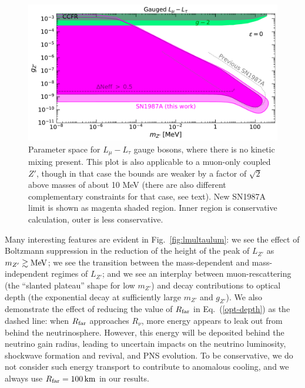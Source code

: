 \documentclass[11pt]{article}
\newcommand{\Eq}[1]{Eq.~(\ref{#1})} \newcommand{\Eqs}[2]{Eqs.~(\ref{#1}) and (\ref{#2})} \newcommand{\Eqm}[2]{Eqs.~(\ref{#1}) through (\ref{#2})}
\begin{document}
\begin{figure}[t!]
  \includegraphics[width=\columnwidth]{zp_mu} \caption{Parameter space for $L_\mu-L_\tau$ gauge bosons, where there is no kinetic mixing present. This plot is also applicable to a muon-only coupled $Z'$, though in that case the bounds are weaker by a factor of $\sqrt{2}$ above masses of about 10 MeV (there are also different complementary constraints for that case, see text). New SN1987A limit is shown as magenta shaded region. Inner region is conservative calculation, outer is less conservative.}
  \label{fig:lmultau}
\end{figure}


Many interesting features are evident in Fig.~\ref{fig:lmultaulum}: we see the effect of Boltzmann suppression in the reduction of the height of the peak of $L_{Z'}$ as $m_{Z'}\gtrsim \operatorname{MeV}$; we see the transition between the mass-dependent and mass-independent regimes of $L_{Z'}$; and we see an interplay between muon-rescattering (the ``slanted plateau'' shape for low $m_{Z'}$) and decay contributions to optical depth (the exponential decay at sufficiently large $m_{Z'}$ and $g_{Z'}$). We also demonstrate the effect of reducing the value of $R_{\rm far}$ in \Eq{opt-depth} as the dashed line: when $R_{\rm far}$ approaches $R_\nu$, more energy appears to leak out from behind the neutrinosphere. However, this energy will be deposited behind the neutrino gain radius, leading to uncertain impacts on the neutrino luminosity, shockwave formation and revival, and PNS evolution. To be conservative, we do not consider such energy transport to contribute to anomalous cooling, and we always use $R_{\rm far}=100\operatorname{km}$ in our results. 
\end{document}

